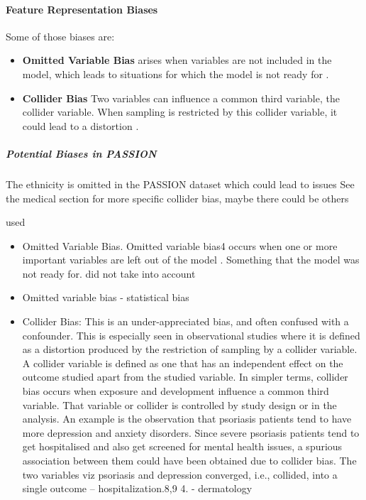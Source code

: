 \documentclass[12pt, a4paper, oneside]{book}   	%
\newif\ifrawcitationactive
\newcommand{\rawcitationstart}{\color{purple}\rawcitationactivetrue}
\newcommand{\rawcitationend}{\color{black}\rawcitationactivefalse}
\newcommand{\rawcitationusedstart}{\color{violet}}
\newcommand{\rawcitationusedend}{%
	\ifrawcitationactive
	\color{purple}  %
	\else
	\color{black}  %
	\fi
}
\begin{document}
			\paragraph{Feature Representation Biases}
			
			Some of those biases are:
			\begin{itemize}
				\item \textbf{Omitted Variable Bias} arises when variables are not included in the model, which leads to situations for which the model is not ready for \autocites{Mehrabi_2021}{Mester_2022}\autocites{M38_Clarke_2005}{M131_Riegg_2008}\autocite{M114_Mustard_2003}.
				\item \textbf{Collider Bias} Two variables can influence a common third variable, the collider variable. When sampling is restricted by this collider variable, it could lead to a distortion  \autocite{Chakraborty_2024, c4,c8,c9}.
			\end{itemize}
			
			
			\subparagraph{Potential Biases in PASSION}
			The ethnicity is omitted in the PASSION dataset which could lead to issues
			See the medical section for more specific collider bias, maybe there could be others
			
			\rawcitationstart
			used
			\begin{itemize}
				\rawcitationusedstart
				\item Omitted Variable Bias. Omitted variable bias4 occurs when one or more important variables are left out of the model \autocites{M38_Clarke_2005}{M131_Riegg_2008}\autocite{M114_Mustard_2003}. Something that the model was not ready for\autocite{Mehrabi_2021}. did not take into account \autocite{Mehrabi_2021}
				\item Omitted variable bias \autocites{Mester_2022}{Mester_2017} - statistical bias
				\item Collider Bias: This is an under-appreciated bias, and often confused with a confounder. This is especially seen in observational studies where it is defined as a distortion produced by the restriction of sampling by a collider variable. A collider variable is defined as one that has an independent effect on the outcome studied apart from the studied variable. In simpler terms, collider bias occurs when exposure and development influence a common third variable. That variable or collider is controlled by study design or in the analysis. An example is the observation that psoriasis patients tend to have more depression and anxiety disorders. Since severe psoriasis patients tend to get hospitalised and also get screened for mental health issues, a spurious association between them could have been obtained due to collider bias. The two variables viz psoriasis and depression converged, i.e., collided, into a single outcome – hospitalization.8,9 4. \autocite{Chakraborty_2024} - dermatology
				\rawcitationusedend
			\end{itemize}
			\rawcitationend
			
\end{document}
